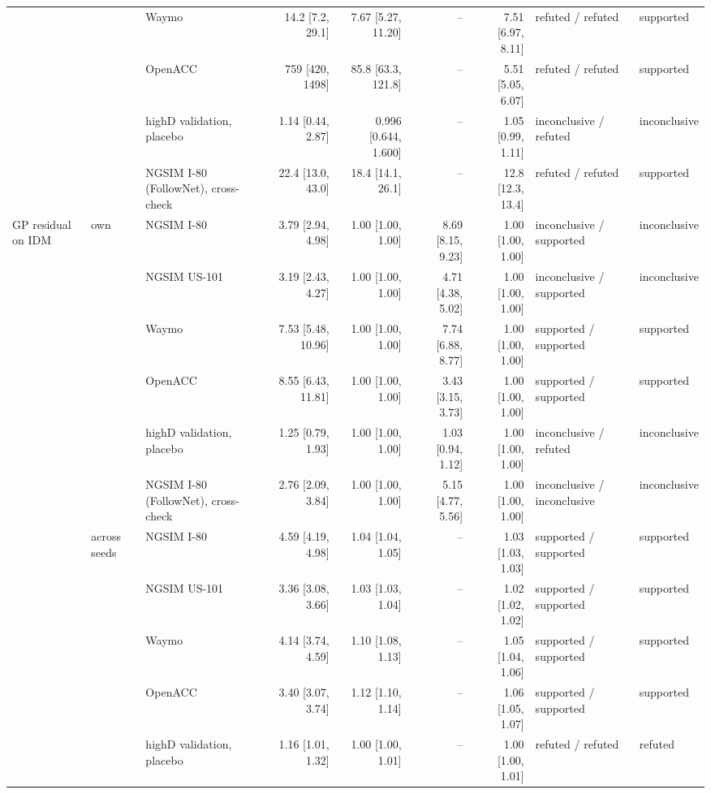 \begin{longtable}{lllrrrrll}
 &  & Waymo & 14.2 [7.2, 29.1] & 7.67 [5.27, 11.20] & -- & 7.51 [6.97, 8.11] & refuted / refuted & supported \\
 &  & OpenACC & 759 [420, 1498] & 85.8 [63.3, 121.8] & -- & 5.51 [5.05, 6.07] & refuted / refuted & supported \\
 &  & highD validation, placebo & 1.14 [0.44, 2.87] & 0.996 [0.644, 1.600] & -- & 1.05 [0.99, 1.11] & inconclusive / refuted & inconclusive \\
 &  & NGSIM I-80 (FollowNet), cross-check & 22.4 [13.0, 43.0] & 18.4 [14.1, 26.1] & -- & 12.8 [12.3, 13.4] & refuted / refuted & supported \\
\midrule
GP residual on IDM & own & NGSIM I-80 & 3.79 [2.94, 4.98] & 1.00 [1.00, 1.00] & 8.69 [8.15, 9.23] & 1.00 [1.00, 1.00] & inconclusive / supported & inconclusive \\
 &  & NGSIM US-101 & 3.19 [2.43, 4.27] & 1.00 [1.00, 1.00] & 4.71 [4.38, 5.02] & 1.00 [1.00, 1.00] & inconclusive / supported & inconclusive \\
 &  & Waymo & 7.53 [5.48, 10.96] & 1.00 [1.00, 1.00] & 7.74 [6.88, 8.77] & 1.00 [1.00, 1.00] & supported / supported & supported \\
 &  & OpenACC & 8.55 [6.43, 11.81] & 1.00 [1.00, 1.00] & 3.43 [3.15, 3.73] & 1.00 [1.00, 1.00] & supported / supported & supported \\
 &  & highD validation, placebo & 1.25 [0.79, 1.93] & 1.00 [1.00, 1.00] & 1.03 [0.94, 1.12] & 1.00 [1.00, 1.00] & inconclusive / refuted & inconclusive \\
 &  & NGSIM I-80 (FollowNet), cross-check & 2.76 [2.09, 3.84] & 1.00 [1.00, 1.00] & 5.15 [4.77, 5.56] & 1.00 [1.00, 1.00] & inconclusive / inconclusive & inconclusive \\
\midrule
 & across seeds & NGSIM I-80 & 4.59 [4.19, 4.98] & 1.04 [1.04, 1.05] & -- & 1.03 [1.03, 1.03] & supported / supported & supported \\
 &  & NGSIM US-101 & 3.36 [3.08, 3.66] & 1.03 [1.03, 1.04] & -- & 1.02 [1.02, 1.02] & supported / supported & supported \\
 &  & Waymo & 4.14 [3.74, 4.59] & 1.10 [1.08, 1.13] & -- & 1.05 [1.04, 1.06] & supported / supported & supported \\
 &  & OpenACC & 3.40 [3.07, 3.74] & 1.12 [1.10, 1.14] & -- & 1.06 [1.05, 1.07] & supported / supported & supported \\
 &  & highD validation, placebo & 1.16 [1.01, 1.32] & 1.00 [1.00, 1.01] & -- & 1.00 [1.00, 1.01] & refuted / refuted & refuted \\

\end{longtable}
